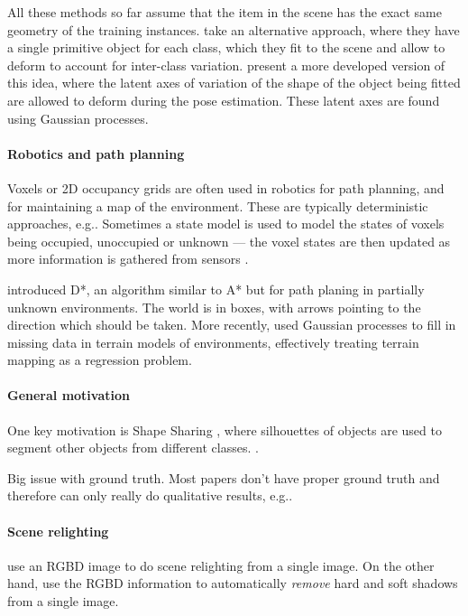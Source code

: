 \documentclass[10pt,a4paper, twocolumn]{article}
\makeatletter
\newcommand*{\eg}{e.g.\@\xspace}
\makeatother
\begin{document}
All these methods so far assume that the item in the scene has the exact same geometry of the training instances.
\cite{cocias-cgvcv-2013} take an alternative approach, where they have a single primitive object for each class, which they fit to the scene and allow to deform to account for inter-class variation.
\cite{prisacariu-iccv-2011} present a more developed version of this idea, where the latent axes of variation of the shape of the object being fitted are allowed to deform during the pose estimation. 
These latent axes are found using Gaussian processes.

\paragraph{Robotics and path planning}
Voxels or 2D occupancy grids are often used in robotics for path planning, and for maintaining a map of the environment. 
These are typically deterministic approaches, \eg \cite{jetchev-icra-2010}. Sometimes a state model is used to model the states of voxels being occupied, unoccupied or unknown --- the voxel states are then updated as more information is gathered from sensors \cite{toussaint-techreport-2007}.

\cite{stentz-icra-1994} introduced D*, an algorithm similar to A* but for path planing in partially unknown environments. 
The world is in boxes, with arrows pointing to the direction which should be taken.
More recently, \cite{plagemann-iros-2008} used Gaussian processes to fill in missing data in terrain models of environments, effectively treating terrain mapping as a regression problem.

\paragraph{General motivation}
One key motivation is Shape Sharing \cite{kim-eccv-2012}, where silhouettes of objects are used to segment other objects from different classes.
 \cite{nan-acm-2012}.

Big issue with ground truth. Most papers don't have proper ground truth and therefore can only really do qualitative results, \eg \cite{all the papers...}.

\paragraph{Scene relighting}
\cite{ikeda-acpr-2013} use an RGBD image to do scene relighting from a single image.
On the other hand, \cite{xiao-cvpr-2014} use the RGBD information to automatically \textit{remove} hard and soft shadows from a single image.
\end{document}
